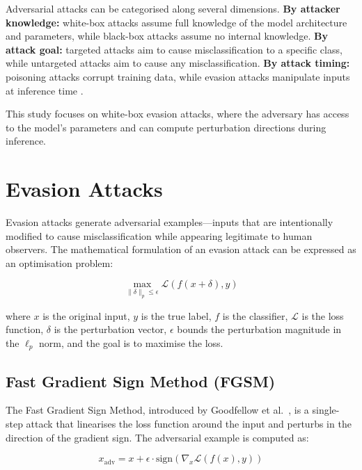 \documentclass[12pt,a4paper,oneside]{report}
\begin{document}
Adversarial attacks can be categorised along several dimensions. \textbf{By attacker knowledge:} white-box attacks assume full knowledge of the model architecture and parameters, while black-box attacks assume no internal knowledge. \textbf{By attack goal:} targeted attacks aim to cause misclassification to a specific class, while untargeted attacks aim to cause any misclassification. \textbf{By attack timing:} poisoning attacks corrupt training data, while evasion attacks manipulate inputs at inference time \cite{biggio2013evasion}.

This study focuses on white-box evasion attacks, where the adversary has access to the model's parameters and can compute perturbation directions during inference.

\section{Evasion Attacks}

Evasion attacks generate adversarial examples---inputs that are intentionally modified to cause misclassification while appearing legitimate to human observers. The mathematical formulation of an evasion attack can be expressed as an optimisation problem:

\begin{equation}
    \label{eq:evasion}
    \max_{\|\delta\|_p \leq \epsilon} \mathcal{L}(f(x + \delta), y)
\end{equation}

\noindent where $x$ is the original input, $y$ is the true label, $f$ is the classifier, $\mathcal{L}$ is the loss function, $\delta$ is the perturbation vector, $\epsilon$ bounds the perturbation magnitude in the $\ell_p$ norm, and the goal is to maximise the loss.

\subsection{Fast Gradient Sign Method (FGSM)}

The Fast Gradient Sign Method, introduced by Goodfellow et al.~\cite{goodfellow2015explaining}, is a single-step attack that linearises the loss function around the input and perturbs in the direction of the gradient sign. The adversarial example is computed as:

\begin{equation}
    \label{eq:fgsm}
    x_{\text{adv}} = x + \epsilon \cdot \text{sign}(\nabla_x \mathcal{L}(f(x), y))
\end{equation}
\end{document}

